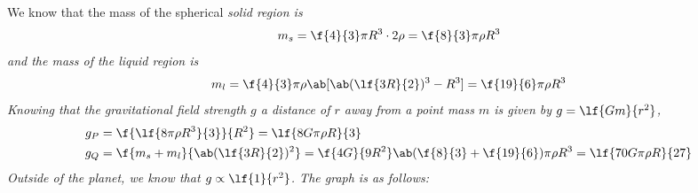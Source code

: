 We know that the mass of the spherical \it{solid} region is
\begin{equation*}
	m_s = \f{4}{3}\pi R^3 \cdot 2\rho = \f{8}{3}\pi\rho R^3
\end{equation*}
and the mass of the \it{liquid} region is
\begin{equation*}
	m_l = \f{4}{3} \pi\rho\ab[\ab(\lf{3R}{2})^3 - R^3] = \f{19}{6}\pi\rho R^3
\end{equation*}
Knowing that the gravitational field strength \(g\) a distance of \(r\) away from a point mass \(m\) is given by \(g = \lf{Gm}{r^2}\),
\begin{align}
	\label{eq:gfp}
	g_P & = \f{\lf{8\pi\rho R^3}{3}}{R^2} = \lf{8G\pi\rho R}{3}                                                       \\
	\label{eq:gfq}
	g_Q & = \f{m_s + m_l}{\ab(\lf{3R}{2})^2} = \f{4G}{9R^2}\ab(\f{8}{3}+\f{19}{6})\pi\rho R^3 = \lf{70G\pi\rho R}{27}
\end{align}
Outside of the planet, we know that \(g \propto \lf{1}{r^2}\). The graph is as follows:
\begin{figure}[htpb]
\end{figure}


